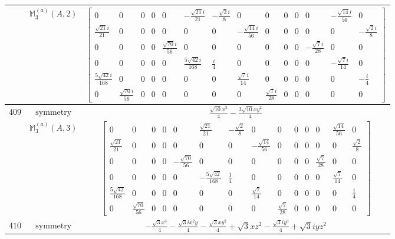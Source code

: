 \documentclass[fleqn,8pt,landscape]{jsarticle}
\begin{document}
\begin{longtable}{ccc}
$  $ & $ \mathbb{M}_{3}^{(a)}(A,2) $ & $ \begin{bmatrix} 0 & 0 & 0 & 0 & 0 & - \frac{\sqrt{21} i}{21} & - \frac{\sqrt{2} i}{8} & 0 & 0 & 0 & 0 & 0 & - \frac{\sqrt{14} i}{56} & 0 \\ \frac{\sqrt{21} i}{21} & 0 & 0 & 0 & 0 & 0 & 0 & - \frac{\sqrt{14} i}{56} & 0 & 0 & 0 & 0 & 0 & - \frac{\sqrt{2} i}{8} \\ 0 & 0 & 0 & 0 & \frac{\sqrt{70} i}{56} & 0 & 0 & 0 & 0 & 0 & 0 & - \frac{\sqrt{7} i}{28} & 0 & 0 \\ 0 & 0 & 0 & 0 & 0 & \frac{5 \sqrt{42} i}{168} & \frac{i}{4} & 0 & 0 & 0 & 0 & 0 & - \frac{\sqrt{7} i}{14} & 0 \\ \frac{5 \sqrt{42} i}{168} & 0 & 0 & 0 & 0 & 0 & 0 & \frac{\sqrt{7} i}{14} & 0 & 0 & 0 & 0 & 0 & - \frac{i}{4} \\ 0 & \frac{\sqrt{70} i}{56} & 0 & 0 & 0 & 0 & 0 & 0 & \frac{\sqrt{7} i}{28} & 0 & 0 & 0 & 0 & 0 \end{bmatrix} $ \\ \hline
$ 409 $ & $ \text{symmetry} $ & $ \frac{\sqrt{10} x^{3}}{4} - \frac{3 \sqrt{10} x y^{2}}{4} $ \\
$  $ & $ \mathbb{M}_{3}^{(a)}(A,3) $ & $ \begin{bmatrix} 0 & 0 & 0 & 0 & 0 & \frac{\sqrt{21}}{21} & - \frac{\sqrt{2}}{8} & 0 & 0 & 0 & 0 & 0 & \frac{\sqrt{14}}{56} & 0 \\ \frac{\sqrt{21}}{21} & 0 & 0 & 0 & 0 & 0 & 0 & - \frac{\sqrt{14}}{56} & 0 & 0 & 0 & 0 & 0 & \frac{\sqrt{2}}{8} \\ 0 & 0 & 0 & 0 & - \frac{\sqrt{70}}{56} & 0 & 0 & 0 & 0 & 0 & 0 & \frac{\sqrt{7}}{28} & 0 & 0 \\ 0 & 0 & 0 & 0 & 0 & - \frac{5 \sqrt{42}}{168} & \frac{1}{4} & 0 & 0 & 0 & 0 & 0 & \frac{\sqrt{7}}{14} & 0 \\ \frac{5 \sqrt{42}}{168} & 0 & 0 & 0 & 0 & 0 & 0 & \frac{\sqrt{7}}{14} & 0 & 0 & 0 & 0 & 0 & \frac{1}{4} \\ 0 & \frac{\sqrt{70}}{56} & 0 & 0 & 0 & 0 & 0 & 0 & \frac{\sqrt{7}}{28} & 0 & 0 & 0 & 0 & 0 \end{bmatrix} $ \\ \hline
$ 410 $ & $ \text{symmetry} $ & $ - \frac{\sqrt{3} x^{3}}{4} - \frac{\sqrt{3} i x^{2} y}{4} - \frac{\sqrt{3} x y^{2}}{4} + \sqrt{3} x z^{2} - \frac{\sqrt{3} i y^{3}}{4} + \sqrt{3} i y z^{2} $ \\

\end{longtable}
\end{document}
